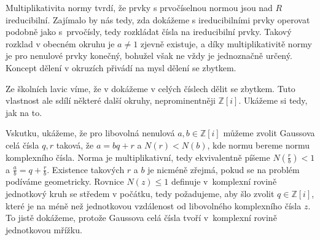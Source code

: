 \documentclass[12pt]{report}
\begin{document}
Multiplikativita normy tvrdí, že prvky s prvočíselnou normou jsou nad $R$ ireducibilní. Zajímalo by nás tedy, zda dokážeme s ireducibilními prvky operovat podobně jako s~prvočísly, tedy rozkládat čísla na ireducibilní prvky. Takový rozklad v obecném okruhu je $a \neq 1$ zjevně existuje, a díky multiplikativitě normy je pro nenulové prvky konečný, bohužel však ne vždy je jednoznačně určený. Koncept dělení v okruzích přivádí na mysl dělení se zbytkem.

Ze školních lavic víme, že v dokážeme v celých číslech dělit se zbytkem. Tuto vlastnost ale sdílí některé další okruhy, neprominentněji $\mathbb{Z}[i]$. Ukážeme si tedy, jak na to.

Vskutku, ukážeme, že pro libovolná nenulová $a,b \in \mathbb{Z}[i]$ můžeme zvolit Gaussova celá čísla $q,r$ taková, že $a = bq+r$ a $N(r) < N(b)$, kde normu bereme normu komplexního čísla.  Norma je multiplikativní, tedy ekvivalentně píšeme $N\left(\frac{r}{b}\right) < 1$ a $\frac{a}{b} = q+\frac{r}{b}$. Existence takových $r$ a $b$ je nicméně zřejmá, pokud se na problém podíváme geometricky. Rovnice $N(z) \leqslant 1$ definuje v~komplexní rovině jednotkový kruh se středem v počátku, tedy požadujeme, aby šlo zvolit $q \in \mathbb{Z}[i]$, které je na méně než jednotkovou vzdálenost od libovolného komplexního čísla $z$. To jistě dokážeme, protože Gaussova celá čísla tvoří v~komplexní rovině jednotkovou mřížku.

\begin{center}
\end{center}
\end{document}
